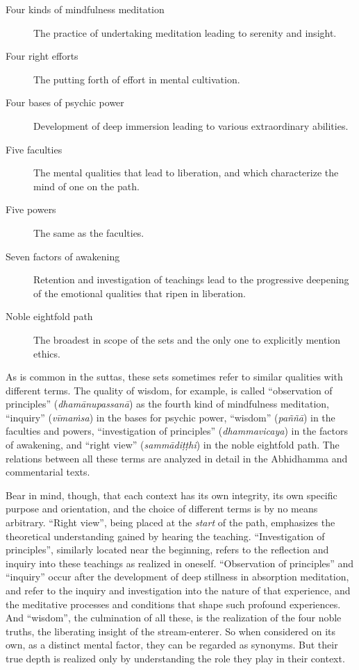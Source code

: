 \documentclass[12pt,openany]{book}%
\begin{document}
\begin{description}%
\item[Four kinds of mindfulness meditation] The practice of undertaking meditation leading to serenity and insight.%
\item[Four right efforts] The putting forth of effort in mental cultivation.%
\item[Four bases of psychic power] Development of deep immersion leading to various extraordinary abilities.%
\item[Five faculties] The mental qualities that lead to liberation, and which characterize the mind of one on the path.%
\item[Five powers] The same as the faculties.%
\item[Seven factors of awakening] Retention and investigation of teachings lead to the progressive deepening of the emotional qualities that ripen in liberation.%
\item[Noble eightfold path] The broadest in scope of the sets and the only one to explicitly mention ethics.%
\end{description}

As is common in the suttas, these sets sometimes refer to similar qualities with different terms. The quality of wisdom, for example, is called “observation of principles” (\textit{\textsanskrit{dhamānupassanā}}) as the fourth kind of mindfulness meditation, “inquiry” (\textit{\textsanskrit{vīmaṁsa}}) in the bases for psychic power, “wisdom” (\textit{\textsanskrit{paññā}}) in the faculties and powers, “investigation of principles” (\textit{dhammavicaya}) in the factors of awakening, and “right view” (\textit{\textsanskrit{sammādiṭṭhi}}) in the noble eightfold path. The relations between all these terms are analyzed in detail in the Abhidhamma and commentarial texts.

Bear in mind, though, that each context has its own integrity, its own specific purpose and orientation, and the choice of different terms is by no means arbitrary. “Right view”, being placed at the \emph{start} of the path, emphasizes the theoretical understanding gained by hearing the teaching. “Investigation of principles”, similarly located near the beginning, refers to the reflection and inquiry into these teachings as realized in oneself. “Observation of principles” and “inquiry” occur after the development of deep stillness in absorption meditation, and refer to the inquiry and investigation into the nature of that experience, and the meditative processes and conditions that shape such profound experiences. And “wisdom”, the culmination of all these, is the realization of the four noble truths, the liberating insight of the stream-enterer. So when considered on its own, as a distinct mental factor, they can be regarded as synonyms. But their true depth is realized only by understanding the role they play in their context.
\end{document}
